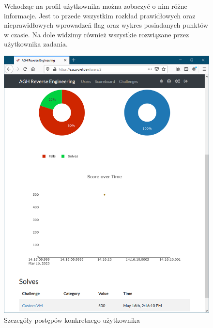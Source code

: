 \documentclass[polish,12pt]{aghthesis}
\begin{document}
\begin{figure}[ht]
Wchodząc na profil użytkownika można zobaczyć o nim różne informacje.
Jest to przede wszystkim rozkład prawidłowych oraz nieprawidłowych
    wprowadzeń flag oraz wykres posiadanych punktów w czasie.
    Na dole widzimy również wszystkie rozwiązane przez użytkownika zadania.

    \vspace{1cm}

    \centering
    \includegraphics[width=14cm]{szczygiel_dev_user_info}
    \caption{Szczegóły postępów konkretnego użytkownika}
    \label{fig:szczygiel_dev_user_info}
\end{figure}
\end{document}
